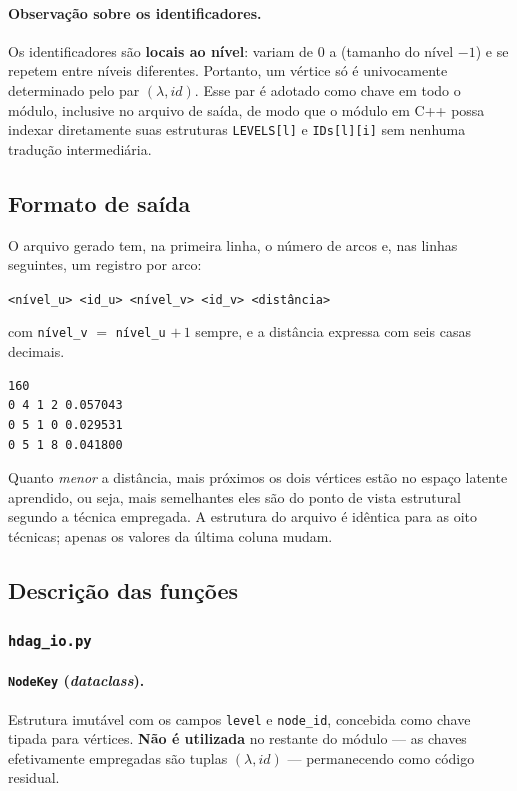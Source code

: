 \documentclass[12pt,a4paper]{article}
\begin{document}
\paragraph{Observação sobre os identificadores.} Os identificadores são
\textbf{locais ao nível}: variam de $0$ a (tamanho do nível $-1$) e se
repetem entre níveis diferentes. Portanto, um vértice só é univocamente
determinado pelo par $(\lambda, id)$. Esse par é adotado como chave em
todo o módulo, inclusive no arquivo de saída, de modo que o módulo em
C++ possa indexar diretamente suas estruturas \texttt{LEVELS[l]} e
\texttt{IDs[l][i]} sem nenhuma tradução intermediária.

\subsection{Formato de saída}

O arquivo gerado tem, na primeira linha, o número de arcos e, nas linhas
seguintes, um registro por arco:

\begin{center}
\texttt{<nível\_u> <id\_u> <nível\_v> <id\_v> <distância>}
\end{center}

\noindent com \texttt{nível\_v} $=$ \texttt{nível\_u} $+\,1$ sempre, e a
distância expressa com seis casas decimais.

\begin{lstlisting}[caption={Trecho de um arquivo \texttt{.dist.txt} gerado.},captionpos=b]
160
0 4 1 2 0.057043
0 5 1 0 0.029531
0 5 1 8 0.041800
\end{lstlisting}

Quanto \emph{menor} a distância, mais próximos os dois vértices estão no
espaço latente aprendido, ou seja, mais semelhantes eles são do ponto de
vista estrutural segundo a técnica empregada. A estrutura do arquivo é
idêntica para as oito técnicas; apenas os valores da última coluna
mudam.

\subsection{Descrição das funções}

\subsubsection{\texttt{hdag\_io.py}}

\paragraph{\texttt{NodeKey} (\textit{dataclass}).}
Estrutura imutável com os campos \texttt{level} e \texttt{node\_id},
concebida como chave tipada para vértices. \textbf{Não é utilizada} no
restante do módulo --- as chaves efetivamente empregadas são tuplas
$(\lambda, id)$ --- permanecendo como código residual.
\end{document}
